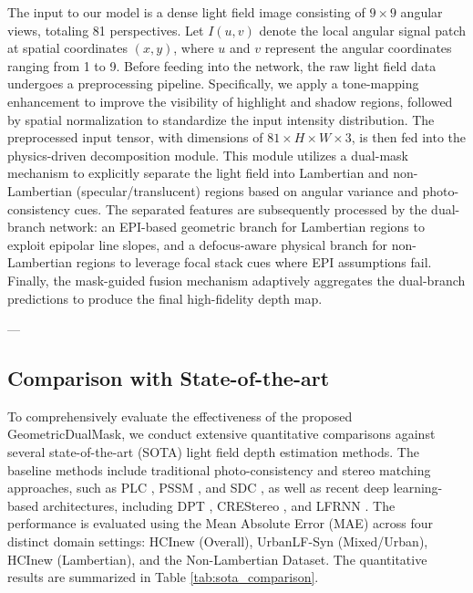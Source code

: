 \documentclass[lettersize,journal]{IEEEtran}
\begin{document}
The input to our model is a dense light field image consisting of $9 \times 9$ angular views, totaling 81 perspectives. Let $I(u,v)$ denote the local angular signal patch at spatial coordinates $(x,y)$, where $u$ and $v$ represent the angular coordinates ranging from 1 to 9. Before feeding into the network, the raw light field data undergoes a preprocessing pipeline. Specifically, we apply a tone-mapping enhancement to improve the visibility of highlight and shadow regions, followed by spatial normalization to standardize the input intensity distribution. The preprocessed input tensor, with dimensions of $81 \times H \times W \times 3$, is then fed into the physics-driven decomposition module. This module utilizes a dual-mask mechanism to explicitly separate the light field into Lambertian and non-Lambertian (specular/translucent) regions based on angular variance and photo-consistency cues. The separated features are subsequently processed by the dual-branch network: an EPI-based geometric branch for Lambertian regions to exploit epipolar line slopes, and a defocus-aware physical branch for non-Lambertian regions to leverage focal stack cues where EPI assumptions fail. Finally, the mask-guided fusion mechanism adaptively aggregates the dual-branch predictions to produce the final high-fidelity depth map.

---


\subsection{Comparison with State-of-the-art}

To comprehensively evaluate the effectiveness of the proposed GeometricDualMask, we conduct extensive quantitative comparisons against several state-of-the-art (SOTA) light field depth estimation methods. The baseline methods include traditional photo-consistency and stereo matching approaches, such as PLC \cite{plc}, PSSM \cite{pssm}, and SDC \cite{sdc}, as well as recent deep learning-based architectures, including DPT \cite{dpt}, CREStereo \cite{crestereo}, and LFRNN \cite{lfrnn}. The performance is evaluated using the Mean Absolute Error (MAE) across four distinct domain settings: HCInew (Overall), UrbanLF-Syn (Mixed/Urban), HCInew (Lambertian), and the Non-Lambertian Dataset. The quantitative results are summarized in Table \ref{tab:sota_comparison}.
\end{document}
